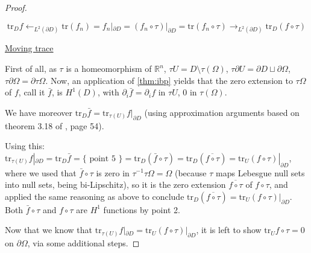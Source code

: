 \documentclass[english,a4paper,9pt,oneside]{scrbook}	%
\theoremstyle{break}
\newenvironment{mproof}[1][\proofname]{%
  \begin{proof}[#1]$ $\par\nobreak\ignorespaces
}{%
  \end{proof}
}
\renewcommand*{\proofname}{Proof}
\theoremstyle{remark}
\newcommand{\mR}{\mathbb{R}}
\newcommand{\tr}{\text{tr}}
\newcommand{\ind}[1]{\{\text{ #1 }\}}
\begin{document}
\begin{appendices}
\begin{mproof}
$$\tr_D f \leftarrow_{L^2(\partial D)}\tr(f_n) = f_n|_{\partial D} = (f_n\circ \tau)|_{\partial D}= \tr(f_n \circ \tau)\rightarrow_{L^2(\partial D)} \tr_D(f \circ \tau)$$

\underline{Moving trace}

First of all, as $\tau$ is a homeomorphism of $\mR^{n}$, $\tau U=D\setminus \tau(\Omega)$, $\tau\partial U = \partial D \sqcup \partial \Omega$, $\tau\partial \Omega = \partial \tau \Omega$.
%
Now, an application of \cref{thm:ibp} yields that the zero extension to $\tau\Omega$ of $f$, call it $\bar{f}$, is $H^1(D)$, with $\partial_i \bar{f}=\partial_i f$ in $\tau U$, $0$ in $\tau(\Omega)$.

We have moreover $\tr_D \bar{f} = \tr_{\tau(U)} f|_{\partial D}$ (using approximation arguments based on theorem 3.18 of \cite{adams}, page 54).

Using this: $ \tr_{\tau(U)}f|_{\partial D} = \tr_D \bar{f} = \ind{point 5} = \tr_D(\bar{f}\circ \tau) = \tr_D(\overline{f \circ \tau}) = \tr_U (f\circ \tau)|_{\partial D}$, where we used that $\bar{f}\circ \tau$ is zero in $\tau^{-1}\tau\Omega = \Omega$ (because $\tau$ maps Lebesgue null sets into null sets, being bi-Lipschitz), so it is the zero extension $\overline{f \circ \tau}$ of $f\circ \tau$, and applied the same reasoning as above to conclude $\tr_D(\overline{f \circ \tau}) = \tr_U (f\circ \tau)|_{\partial D}$. Both $\bar{f}\circ \tau$ and $f\circ \tau$ are $H^1$ functions by point 2.

Now that we know that $ \tr_{\tau(U)}f|_{\partial D}  = \tr_U (f\circ \tau)|_{\partial D}$, it is left to show $\tr_U f\circ \tau=0 $ on $\partial \Omega$, via some additional steps.

%


\end{mproof}
\end{appendices}
\end{document}
